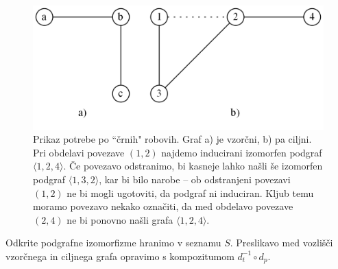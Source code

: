 \documentclass[a4paper, 12pt, ]{book}
\begin{document}
	\begin{figure}
	\begin{center}
	\includegraphics[width=12cm]{img/graph_subsea_black.png}
	\end{center}
	\caption{Prikaz potrebe po ``črnih" robovih. Graf a) je vzorčni, b) pa ciljni. Pri obdelavi povezave $(1,2)$ najdemo inducirani izomorfen podgraf
	$\langle 1, 2, 4\rangle$. Če povezavo odstranimo, bi kasneje lahko našli še izomorfen podgraf $\langle 1, 3, 2 \rangle$, kar bi bilo narobe -- ob 
	odstranjeni povezavi $(1,2)$ ne bi mogli ugotoviti, da podgraf ni induciran. Kljub temu moramo povezavo nekako označiti, da med obdelavo povezave 
	$(2,4)$ ne bi ponovno našli grafa $\langle 1, 2, 4\rangle$.}
	\label{pic_subsea_black}
	\end{figure}
	
	Odkrite podgrafne izomorfizme hranimo v seznamu $S$. Preslikavo med vozlišči vzorčnega in ciljnega grafa opravimo s kompozitumom 
	$d_t^{-1}\circ d_p$.
	
\end{document}
